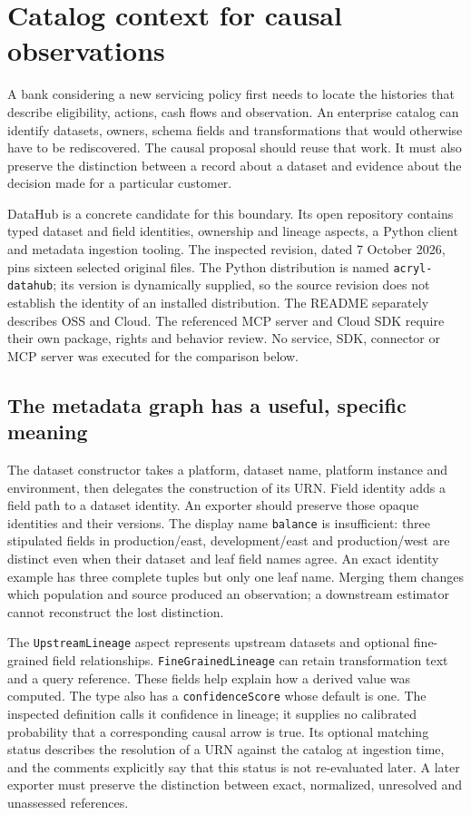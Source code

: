 \chapter{Catalog context for causal observations}
\label{exec16:datahub}

A bank considering a new servicing policy first needs to locate the histories
that describe eligibility, actions, cash flows and observation. An enterprise
catalog can identify datasets, owners, schema fields and transformations that
would otherwise have to be rediscovered. The causal proposal should reuse that
work. It must also preserve the distinction between a record about a dataset
and evidence about the decision made for a particular customer.

DataHub is a concrete candidate for this boundary. Its open repository contains
typed dataset and field identities, ownership and lineage aspects, a Python
client and metadata ingestion tooling. The inspected revision, dated 7 October
2026, pins sixteen selected original files. The Python distribution is named
\texttt{acryl-datahub}; its version is dynamically supplied, so the source
revision does not establish the identity of an installed distribution. The
README separately describes OSS and Cloud. The referenced MCP server and
Cloud SDK require their own package, rights and behavior review. No service,
SDK, connector or MCP server was executed for the comparison below.
\citep{exec16_dh_primary,exec16_dh_rights}

\section{The metadata graph has a useful, specific meaning}

The dataset constructor takes a platform, dataset name, platform instance and
environment, then delegates the construction of its URN. Field identity adds
a field path to a dataset identity. An exporter should preserve those opaque
identities and their versions. The display name \texttt{balance} is insufficient:
three stipulated fields in production/east, development/east and production/west
are distinct even when their dataset and leaf field names agree. An exact
identity example has three complete tuples but only one leaf name. Merging
them changes which population and source produced an observation; a downstream
estimator cannot reconstruct the lost distinction.
\citep{exec16_dh_primary,exec16_dh_exact}

The \texttt{UpstreamLineage} aspect represents upstream datasets and optional
fine-grained field relationships. \texttt{FineGrainedLineage} can retain
transformation text and a query reference. These fields help explain how a
derived value was computed. The type also has a \texttt{confidenceScore}
whose default is one. The inspected definition calls it confidence in lineage;
it supplies no calibrated probability that a corresponding causal arrow is
true. Its optional matching status describes the resolution of a URN against
the catalog at ingestion time, and the comments explicitly say that this
status is not re-evaluated later. A later exporter must preserve the distinction
between exact, normalized, unresolved and unassessed references.
\citep{exec16_dh_primary}


